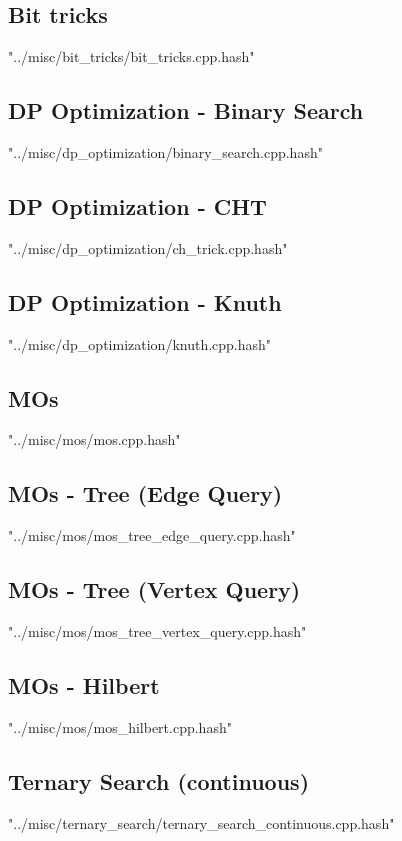 \documentclass [a4paper,5pt,oneside, landscape]{article}
\begin{document}
\begin{multicols}{3}
\subsection{ Bit tricks}
 {"../misc/bit_tricks/bit_tricks.cpp.hash"}


\subsection{ DP Optimization - Binary Search}
 {"../misc/dp_optimization/binary_search.cpp.hash"}


\subsection{ DP Optimization - CHT}
 {"../misc/dp_optimization/ch_trick.cpp.hash"}


\subsection{ DP Optimization - Knuth}
 {"../misc/dp_optimization/knuth.cpp.hash"}


\subsection{ MOs}
 {"../misc/mos/mos.cpp.hash"}


\subsection{ MOs - Tree (Edge Query)}
 {"../misc/mos/mos_tree_edge_query.cpp.hash"}


\subsection{ MOs - Tree (Vertex Query)}
 {"../misc/mos/mos_tree_vertex_query.cpp.hash"}


\subsection{ MOs - Hilbert}
 {"../misc/mos/mos_hilbert.cpp.hash"}


\subsection{ Ternary Search (continuous)}
 {"../misc/ternary_search/ternary_search_continuous.cpp.hash"}



\end{multicols}
\end{document}
